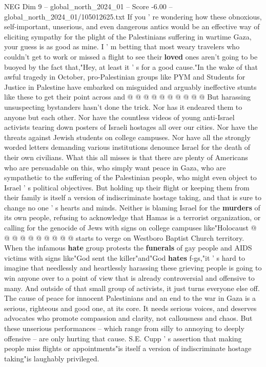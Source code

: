 \begin{textsample}{NEG Dim 9 – global\_north\_2024\_01 – Score -6.00 – global\_north\_2024\_01/105012625.txt}
If you ' re wondering how these obnoxious, self-important, unserious, and even dangerous antics would be an effective way of eliciting sympathy for the plight of the Palestinians suffering in wartime Gaza, your guess is as good as mine.
I ' m betting that most weary travelers who couldn't get to work or missed a flight to see their \textbf{loved} ones aren't going to be buoyed by the fact that,"Hey, at least it ' s for a good cause."In the wake of that awful tragedy in October, pro-Palestinian groups like PYM and Students for Justice in Palestine have embarked on misguided and arguably ineffective stunts like these to get their point across and @ @ @ @ @ @ @ @ @ @ But harassing unsuspecting bystanders hasn't done the trick.
Nor has it endeared them to anyone but each other.
Nor have the countless videos of young anti-Israel activists tearing down posters of Israeli hostages all over our cities.
Nor have the threats against Jewish students on college campuses.
Nor have all the strongly worded letters demanding various institutions denounce Israel for the death of their own civilians.
What this all misses is that there are plenty of Americans who are persuadable on this, who simply want peace in Gaza, who are sympathetic to the suffering of the Palestinian people, who might even object to Israel ' s political objectives.
But holding up their flight or keeping them from their family is itself a version of indiscriminate hostage taking, and that is sure to change no one ' s hearts and minds.
Neither is blaming Israel for the \textbf{murders} of its own people, refusing to acknowledge that Hamas is a terrorist organization, or calling for the genocide of Jews with signs on college campuses like"Holocaust @ @ @ @ @ @ @ @ @ @ starts to verge on Westboro Baptist Church territory.
When the infamous \textbf{hate} group protests the \textbf{funerals} of gay people and AIDS victims with signs like"God sent the killer"and"God \textbf{hates} f-gs,"it ' s hard to imagine that needlessly and heartlessly harassing these grieving people is going to win anyone over to a point of view that is already controversial and offensive to many.
And outside of that small group of activists, it just turns everyone else off.
The cause of peace for innocent Palestinians and an end to the war in Gaza is a serious, righteous and good one, at its core.
It needs serious voices, and deserves advocates who promote compassion and clarity, not callousness and chaos.
But these unserious performances -- which range from silly to annoying to deeply offensive -- are only hurting that cause.
S.E.
Cupp ' s assertion that making people miss flights or appointments"is itself a version of indiscriminate hostage taking"is laughably privileged.

\end{textsample}
